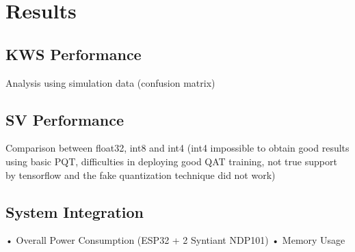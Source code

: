 \chapter{Results}
\label{cha:results}
\section{KWS Performance}
\label{sec:kws performance}
Analysis using simulation data (confusion matrix)\newline 
\section{SV Performance}
\label{sec:sv performance}
Comparison between float32, int8 and int4 (int4 impossible to obtain good results using basic PQT, difficulties in deploying good QAT training, not true support by tensorflow and the fake quantization technique did not work)\newline 
\section{System Integration}
\label{sec: system integration}
• Overall Power Consumption (ESP32 + 2 Syntiant NDP101)\newline
• Memory Usage\newline 

\newpage
